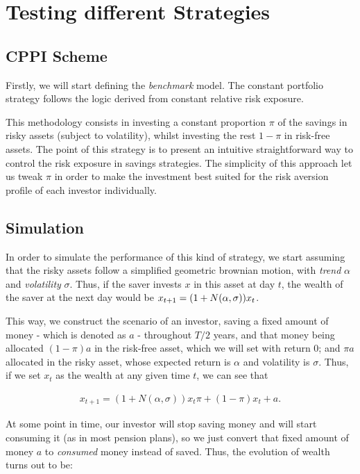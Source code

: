 \section{Testing different Strategies}

\subsection{CPPI Scheme}

Firstly, we will start defining the \textit{benchmark} model. The constant portfolio strategy follows the logic derived from constant relative risk exposure.

This methodology consists in investing a constant proportion $\pi$ of the savings in risky assets (subject to volatility), whilst investing the rest $1 - \pi$ in risk-free assets. The point of this strategy is to present an intuitive straightforward way to control the risk exposure in savings strategies. The simplicity of this approach let us tweak $\pi$ in order to make the investment best suited for the risk aversion profile of each investor individually.

\subsection*{Simulation}

In order to simulate the performance of this kind of strategy, we start assuming that the risky assets follow a simplified geometric brownian motion, with \emph{trend} $\alpha$ and \emph{volatility} $\sigma$. Thus, if the saver invests $x$ in this asset at day $t$, the wealth of the saver at the next day would be $x_{t+1} = (1 + N\qty(\alpha, \sigma)) x_t$.

This way, we construct the scenario of an investor, saving a fixed amount of money - which is denoted as $a$ -   throughout $T/2$ years, and that money being allocated $( 1 - \pi) a$ in the risk-free asset, which we will set with return 0; and $\pi a$ allocated in the risky asset, whose expected return is $\alpha$ and volatility is $\sigma$. Thus, if we set $x_t$ as the wealth at any given time $t$, we can see that

\begin{align}
	x_{t+1} = (1+N(\alpha, \sigma))x_{t}\pi + (1 - \pi)x_{t} + a \textit{.}
\end{align}

At some point in time, our investor will stop saving money and will start consuming it (as in most pension plans), so we just convert that fixed amount of money $a$ to \emph{consumed} money instead of saved. Thus, the evolution of wealth turns out to be:

